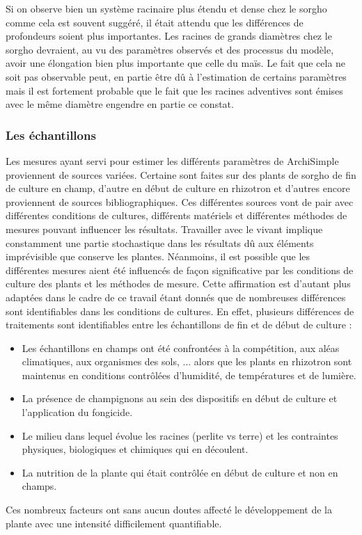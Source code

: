 Si on observe bien un système racinaire plus étendu et dense chez le sorgho comme cela est souvent suggéré, il était attendu que les différences de profondeurs soient plus importantes.
Les racines de grands diamètres chez le sorgho devraient, au vu des paramètres observés et des processus du modèle, avoir une élongation bien plus importante que celle du maïs.
Le fait que cela ne soit pas observable peut, en partie être dû à l'estimation de certains paramètres mais il est fortement probable que le fait que les racines adventives sont émises avec le même diamètre engendre en partie ce constat.

\subsubsection{Les échantillons}

Les mesures ayant servi pour estimer les différents paramètres de ArchiSimple proviennent de sources variées.
Certaine sont faites sur des plants de sorgho de fin de culture en champ, d'autre en début de culture en rhizotron et d'autres encore proviennent de sources bibliographiques.
Ces différentes sources vont de pair avec différentes conditions de cultures, différents matériels et différentes méthodes de mesures pouvant influencer les résultats. 
Travailler avec le vivant implique constamment une partie stochastique dans les résultats dû aux éléments imprévisible que conserve les plantes.
Néanmoins, il est possible que les différentes mesures aient été influencés de façon significative par les conditions de culture des plants et les méthodes de mesure.
Cette affirmation est d'autant plus adaptées dans le cadre de ce travail étant donnés que de nombreuses différences sont identifiables dans les conditions de cultures.
En effet, plusieurs différences de traitements sont identifiables entre les échantillons de fin et de début de culture :
\begin{itemize}
    \item Les échantillons en champs ont été confrontées à la compétition, aux aléas climatiques, aux organismes des sols, ... alors que les plants en rhizotron sont maintenus en conditions contrôlées d'humidité, de températures et de lumière.
    \item La présence de champignons au sein des dispositifs en début de culture et l'application du fongicide.
    \item Le milieu dans lequel évolue les racines (perlite vs terre) et les contraintes physiques, biologiques et chimiques qui en découlent.
    \item La nutrition de la plante qui était contrôlée en début de culture et non en champs.
\end{itemize}
Ces nombreux facteurs ont sans aucun doutes affecté le développement de la plante avec une intensité difficilement quantifiable.


